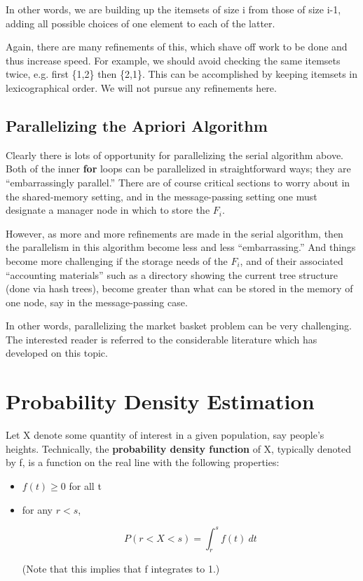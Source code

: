 In other words, we are building up the itemsets of size i from those of
size i-1, adding all possible choices of one element to each of the
latter.

Again, there are many refinements of this, which shave off work to be
done and thus increase speed.  For example, we should avoid checking the
same itemsets twice, e.g. first \{1,2\} then \{2,1\}.  This can be
accomplished by keeping itemsets in lexicographical order.  We will not
pursue any refinements here.

\subsection{Parallelizing the Apriori Algorithm}

Clearly there is lots of opportunity for parallelizing the serial
algorithm above.  Both of the inner {\bf for} loops can be parallelized
in straightforward ways; they are ``embarrassingly parallel.''  There
are of course critical sections to worry about in the shared-memory
setting, and in the message-passing setting one must designate a manager
node in which to store the $F_i$.

However, as more and more refinements are made in the serial algorithm,
then the parallelism in this algorithm become less and less
``embarrassing.''  And things become more challenging if the storage
needs of the $F_i$, and of their associated ``accounting materials''
such as a directory showing the current tree structure (done via
hash trees), become greater than what can be stored in the memory of one
node, say in the message-passing case.

In other words, parallelizing the market basket problem can be very
challenging.  The interested reader is referred to the considerable
literature which has developed on this topic.

\section{Probability Density Estimation}

Let X denote some quantity of interest in a given population, say
people's heights.  Technically, the {\bf probability density function}
of X, typically denoted by f, is a function on the real line with the
following properties:

\begin{itemize}

\item $f(t) \geq 0$ for all t

\item for any $r < s$,

\begin{equation}
P(r < X < s) = \int_{r}^{s} f(t) ~ dt
\end{equation}

(Note that this implies that f integrates to 1.)

\end{itemize}


